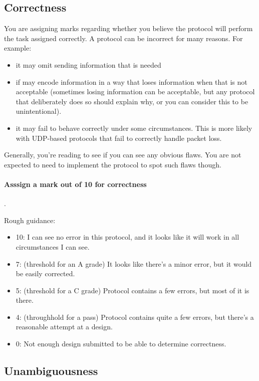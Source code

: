 \documentclass{article}
\begin{document}
\subsection*{Correctness}

You are assigning marks regarding whether you believe the protocol
will perform the task assigned correctly.  A protocol can be incorrect for many reasons.  For example:
\begin{itemize}
 \item it may omit sending information that is needed
\item if may encode information in a way that loses information when that is not acceptable (sometimes losing information can be acceptable, but any protocol that deliberately does so should explain why, or you can consider this to be unintentional).
\item it may fail to behave correctly under some circumstances.  This is more likely with UDP-based protocols that fail to correctly handle packet loss.
\end{itemize}
Generally, you're reading to see if you can see any obvious flaws. You are not expected to need to implement the protocol to spot such flaws though.

\paragraph{Asssign a mark out of 10 for correctness}.

Rough guidance:
\begin{itemize}
\item 10: I can see no error in this protocol, and it looks like it will work in all circumstances I can see.
\item 7:  (threshold for an A grade)  It looks like there's a minor error, but it would be easily corrected.
\item 5:  (threshold for a C grade)  Protocol contains a few errors, but most of it is there.
\item 4: (throughhold for a pass)  Protocol contains quite a few errors, but there's a reasonable attempt at a design.

\item 0: Not enough design submitted to be able to determine correctness.
\end{itemize}

\subsection*{Unambiguousness}
\end{document}
